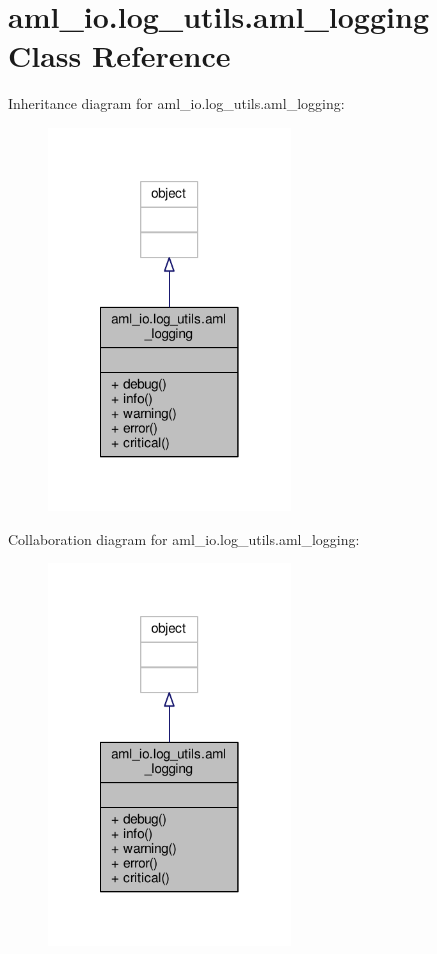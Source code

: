 \hypertarget{classaml__io_1_1log__utils_1_1aml__logging}{\section{aml\-\_\-io.\-log\-\_\-utils.\-aml\-\_\-logging Class Reference}
\label{classaml__io_1_1log__utils_1_1aml__logging}
}


Inheritance diagram for aml\-\_\-io.\-log\-\_\-utils.\-aml\-\_\-logging\-:
\nopagebreak
\begin{figure}[H]
\begin{center}
\leavevmode
\includegraphics[width=182pt]{classaml__io_1_1log__utils_1_1aml__logging__inherit__graph}
\end{center}
\end{figure}


Collaboration diagram for aml\-\_\-io.\-log\-\_\-utils.\-aml\-\_\-logging\-:
\nopagebreak
\begin{figure}[H]
\begin{center}
\leavevmode
\includegraphics[width=182pt]{classaml__io_1_1log__utils_1_1aml__logging__coll__graph}
\end{center}
\end{figure}
